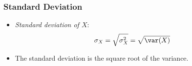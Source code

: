 \begin{frame}
\frametitle{Standard Deviation} 
\begin{itemize}
\item \emph{Standard deviation of $X$}:
\begin{align*}
\sigma_X 
    = \sqrt{\sigma^2_X} 
    = \sqrt{\var(X)}
\end{align*} 
\item The standard deviation is the square root of the variance.
\end{itemize}
\end{frame}


